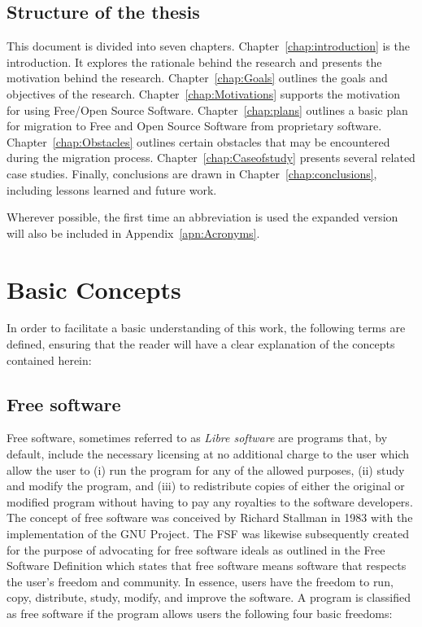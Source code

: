 \subsection{Structure of the thesis}

This document is divided into seven chapters. Chapter~\ref{chap:introduction} is the introduction. It explores the rationale behind the research and presents the motivation behind the research. Chapter~\ref{chap:Goals}  outlines the goals and objectives of the research. Chapter~\ref{chap:Motivations} supports the motivation for using Free/Open Source Software. Chapter~\ref{chap:plans} outlines a basic plan for migration to Free and Open Source Software from proprietary software.  Chapter~\ref{chap:Obstacles} outlines certain obstacles that may be encountered during the migration process. Chapter~\ref{chap:Caseofstudy}  presents several related case studies. Finally, conclusions are drawn in Chapter~\ref{chap:conclusions}, including lessons learned and future work.

 Wherever possible, the first time an abbreviation is used the expanded version will also be included in Appendix~\ref{apn:Acronyms}.
 
 \section{Basic Concepts }

In order to facilitate a basic understanding of this work, the following terms are defined, ensuring that the reader will have a clear explanation of the concepts contained herein:
 
 \subsection{Free software}
 \label{sec:freeopen}
Free software, sometimes referred to as \emph{Libre software} are programs that, by default, include the necessary licensing at no additional charge to the user which allow the user to
 (i) run the program for any of the allowed purposes, (ii) study and modify the program, and (iii) to redistribute copies of either the original or modified program without having to pay any royalties to the software developers. The concept of free software was conceived by Richard Stallman in 1983 with the implementation of the \ac{GNU} Project. The \ac{FSF}  was likewise subsequently created for the purpose of advocating for free software ideals as outlined in the Free Software Definition which states that free software means software that respects the user’s freedom and community. In essence, users have the freedom to run, copy, distribute, study, modify, and improve the software. A program is classified as free software if the program allows users the following four basic freedoms:

